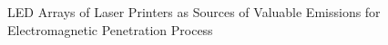LED Arrays of Laser Printers as Sources of Valuable Emissions for
Electromagnetic Penetration Process
